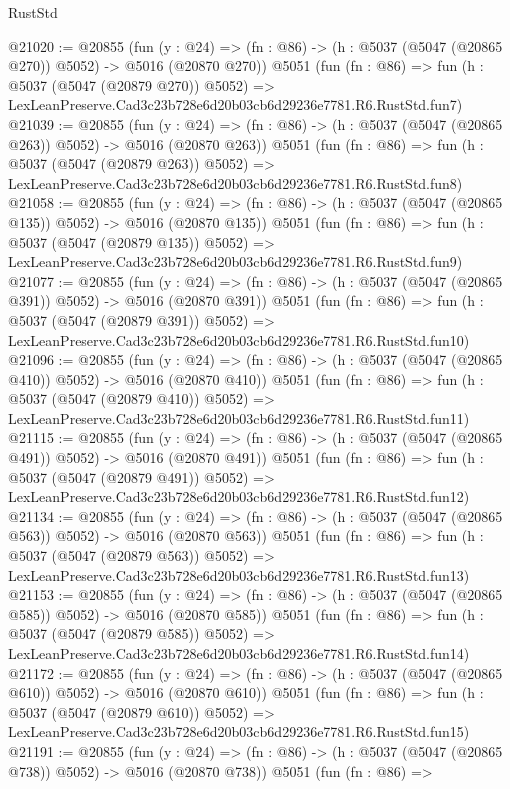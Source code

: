 \begin{lexlean}{RustStd}
\begin{coremodule}
@21020 := @20855
    (fun (y : @24) => (fn : @86) -> (h : @5037 (@5047 (@20865 @270)) @5052) -> @5016 (@20870 @270))
    @5051
    (fun (fn : @86) =>
    fun (h : @5037 (@5047 (@20879 @270)) @5052) =>
    LexLeanPreserve.Cad3c23b728e6d20b03cb6d29236e7781.R6.RustStd.fun7)
@21039 := @20855
    (fun (y : @24) => (fn : @86) -> (h : @5037 (@5047 (@20865 @263)) @5052) -> @5016 (@20870 @263))
    @5051
    (fun (fn : @86) =>
    fun (h : @5037 (@5047 (@20879 @263)) @5052) =>
    LexLeanPreserve.Cad3c23b728e6d20b03cb6d29236e7781.R6.RustStd.fun8)
@21058 := @20855
    (fun (y : @24) => (fn : @86) -> (h : @5037 (@5047 (@20865 @135)) @5052) -> @5016 (@20870 @135))
    @5051
    (fun (fn : @86) =>
    fun (h : @5037 (@5047 (@20879 @135)) @5052) =>
    LexLeanPreserve.Cad3c23b728e6d20b03cb6d29236e7781.R6.RustStd.fun9)
@21077 := @20855
    (fun (y : @24) => (fn : @86) -> (h : @5037 (@5047 (@20865 @391)) @5052) -> @5016 (@20870 @391))
    @5051
    (fun (fn : @86) =>
    fun (h : @5037 (@5047 (@20879 @391)) @5052) =>
    LexLeanPreserve.Cad3c23b728e6d20b03cb6d29236e7781.R6.RustStd.fun10)
@21096 := @20855
    (fun (y : @24) => (fn : @86) -> (h : @5037 (@5047 (@20865 @410)) @5052) -> @5016 (@20870 @410))
    @5051
    (fun (fn : @86) =>
    fun (h : @5037 (@5047 (@20879 @410)) @5052) =>
    LexLeanPreserve.Cad3c23b728e6d20b03cb6d29236e7781.R6.RustStd.fun11)
@21115 := @20855
    (fun (y : @24) => (fn : @86) -> (h : @5037 (@5047 (@20865 @491)) @5052) -> @5016 (@20870 @491))
    @5051
    (fun (fn : @86) =>
    fun (h : @5037 (@5047 (@20879 @491)) @5052) =>
    LexLeanPreserve.Cad3c23b728e6d20b03cb6d29236e7781.R6.RustStd.fun12)
@21134 := @20855
    (fun (y : @24) => (fn : @86) -> (h : @5037 (@5047 (@20865 @563)) @5052) -> @5016 (@20870 @563))
    @5051
    (fun (fn : @86) =>
    fun (h : @5037 (@5047 (@20879 @563)) @5052) =>
    LexLeanPreserve.Cad3c23b728e6d20b03cb6d29236e7781.R6.RustStd.fun13)
@21153 := @20855
    (fun (y : @24) => (fn : @86) -> (h : @5037 (@5047 (@20865 @585)) @5052) -> @5016 (@20870 @585))
    @5051
    (fun (fn : @86) =>
    fun (h : @5037 (@5047 (@20879 @585)) @5052) =>
    LexLeanPreserve.Cad3c23b728e6d20b03cb6d29236e7781.R6.RustStd.fun14)
@21172 := @20855
    (fun (y : @24) => (fn : @86) -> (h : @5037 (@5047 (@20865 @610)) @5052) -> @5016 (@20870 @610))
    @5051
    (fun (fn : @86) =>
    fun (h : @5037 (@5047 (@20879 @610)) @5052) =>
    LexLeanPreserve.Cad3c23b728e6d20b03cb6d29236e7781.R6.RustStd.fun15)
@21191 := @20855
    (fun (y : @24) => (fn : @86) -> (h : @5037 (@5047 (@20865 @738)) @5052) -> @5016 (@20870 @738))
    @5051
    (fun (fn : @86) =>

\end{coremodule}
\end{lexlean}
